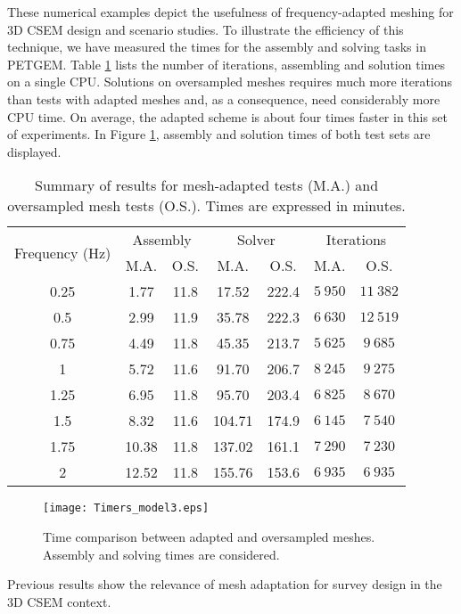 \documentclass[review]{elsarticle}
\begin{document}
These numerical examples depict the usefulness of frequency-adapted meshing for 3D CSEM design and scenario studies. To illustrate the efficiency of this technique, we have measured the times for the assembly and solving tasks in PETGEM. Table \ref{table:summary_results_automatic_adaptation} lists the number of iterations, assembling and solution times on a single CPU. Solutions on oversampled meshes requires much more iterations than tests with adapted meshes and, as a consequence, need considerably more CPU time. On average, the adapted scheme is about four times faster in this set of experiments. In Figure \ref{fig:timers_model3}, assembly and solution times of both test sets are displayed. 
\begin{table}[!htbp]
\centering
\caption{Summary of results for mesh-adapted tests (M.A.) and oversampled mesh tests (O.S.). Times are expressed in minutes.}
\small
\begin{tabular}{ccccccc}
\toprule
\multirow{2}{2.6cm}{Frequency (Hz)} &  \multicolumn{2}{c}{Assembly} & \multicolumn{2}{c}{Solver} & \multicolumn{2}{c}{Iterations}\\
\cline{2-7} & {M.A.} & {O.S.}  & {M.A.} & {O.S.} & {M.A.} & {O.S.}\\
\midrule
0.25 & 1.77  & 11.8 & 17.52  & 222.4 & $5\:950$ & $11\:382$ \\
0.5  & 2.99  & 11.9 & 35.78  & 222.3 & $6\:630$ & $12\:519$ \\
0.75 & 4.49  & 11.8 & 45.35  & 213.7 & $5\:625$ & $9\:685$ \\
1    & 5.72  & 11.6 & 91.70  & 206.7 & $8\:245$ & $9\:275$ \\
1.25 & 6.95  & 11.8 & 95.70  & 203.4 & $6\:825$ & $8\:670$ \\
1.5  & 8.32  & 11.6 & 104.71 & 174.9 & $6\:145$ & $7\:540$ \\
1.75 & 10.38 & 11.8 & 137.02 & 161.1 & $7\:290$ & $7\:230$ \\
2    & 12.52 & 11.8 & 155.76 & 153.6 & $6\:935$ & $6\:935$ \\
\bottomrule
\end{tabular}
\label{table:summary_results_automatic_adaptation}
\end{table}
\begin{figure}[!htbp]
	\centering
	\texttt{[image: Timers\_model3.eps]}
	\caption{Time comparison between adapted and oversampled meshes. Assembly and solving times are considered.}
	\label{fig:timers_model3}
\end{figure}
Previous results show the relevance of mesh adaptation for survey design in the 3D CSEM context.
\end{document}
